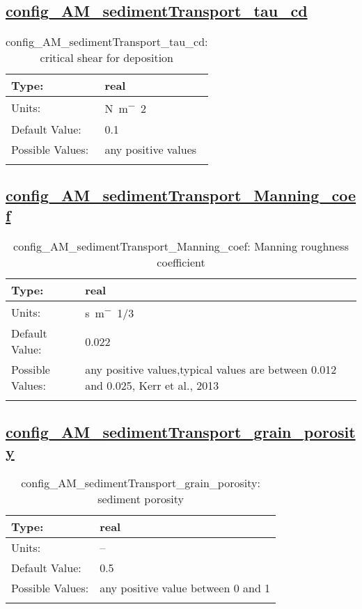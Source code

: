 \subsection[config\_AM\_sedimentTransport\_tau\_cd]{\hyperref[sec:nm_tab_AM_sedimentTransport]{config\_AM\_sedimentTransport\_tau\_cd}}
\label{subsec:nm_sec_config_AM_sedimentTransport_tau_cd}
\begin{center}
\begin{longtable}{| p{2.0in} || p{4.0in} |}
    \hline
    Type: & real \\
    \hline
    Units: & \si{N.m^-2} \\
    \hline
    Default Value: & 0.1 \\
    \hline
    Possible Values: & any positive values \\
    \hline
    \caption{config\_AM\_sedimentTransport\_tau\_cd: critical shear for deposition}
\end{longtable}
\end{center}
\subsection[config\_AM\_sedimentTransport\_Manning\_coef]{\hyperref[sec:nm_tab_AM_sedimentTransport]{config\_AM\_sedimentTransport\_Manning\_coef}}
\label{subsec:nm_sec_config_AM_sedimentTransport_Manning_coef}
\begin{center}
\begin{longtable}{| p{2.0in} || p{4.0in} |}
    \hline
    Type: & real \\
    \hline
    Units: & \si{s.m^-1/3} \\
    \hline
    Default Value: & 0.022 \\
    \hline
    Possible Values: & any positive values,typical values are between 0.012 and 0.025, Kerr et al., 2013 \\
    \hline
    \caption{config\_AM\_sedimentTransport\_Manning\_coef: Manning roughness coefficient}
\end{longtable}
\end{center}
\subsection[config\_AM\_sedimentTransport\_grain\_porosity]{\hyperref[sec:nm_tab_AM_sedimentTransport]{config\_AM\_sedimentTransport\_grain\_porosity}}
\label{subsec:nm_sec_config_AM_sedimentTransport_grain_porosity}
\begin{center}
\begin{longtable}{| p{2.0in} || p{4.0in} |}
    \hline
    Type: & real \\
    \hline
    Units: & -- \\
    \hline
    Default Value: & 0.5 \\
    \hline
    Possible Values: & any positive value between 0 and 1 \\
    \hline
    \caption{config\_AM\_sedimentTransport\_grain\_porosity: sediment porosity}
\end{longtable}
\end{center}
